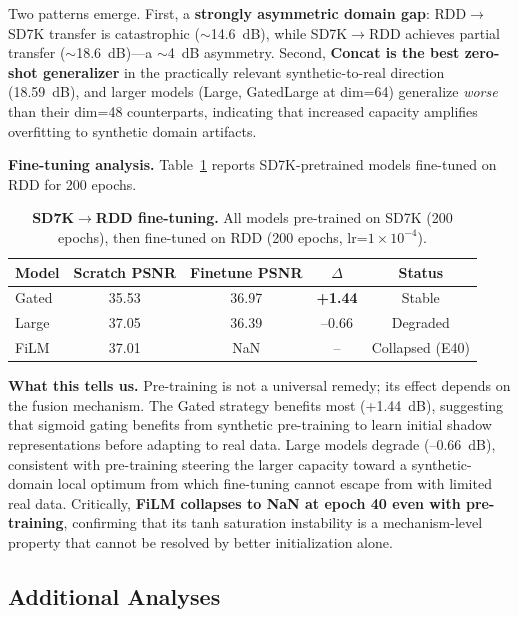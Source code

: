 \documentclass[pdflatex,sn-basic,Numbered]{sn-jnl}
\theoremstyle{thmstyleone}
\theoremstyle{thmstyletwo}
\theoremstyle{thmstylethree}
\begin{document}
Two patterns emerge. First, a \textbf{strongly asymmetric domain gap}: RDD$\rightarrow$SD7K transfer is catastrophic ($\sim$14.6~dB), while SD7K$\rightarrow$RDD achieves partial transfer ($\sim$18.6~dB)---a $\sim$4~dB asymmetry.
Second, \textbf{Concat is the best zero-shot generalizer} in the practically relevant synthetic-to-real direction (18.59~dB), and larger models (Large, GatedLarge at dim=64) generalize \textit{worse} than their dim=48 counterparts, indicating that increased capacity amplifies overfitting to synthetic domain artifacts.

\textbf{Fine-tuning analysis.}
Table~\ref{tab:finetune} reports SD7K-pretrained models fine-tuned on RDD for 200 epochs.

\begin{table}[t]
\caption{\textbf{SD7K$\rightarrow$RDD fine-tuning.} All models pre-trained on SD7K (200 epochs), then fine-tuned on RDD (200 epochs, lr=$1\times10^{-4}$).}
\label{tab:finetune}
\begin{tabular}{@{}lcccc@{}}
\toprule
\textbf{Model} & \textbf{Scratch PSNR} & \textbf{Finetune PSNR} & \textbf{$\Delta$} & \textbf{Status} \\
\midrule
Gated   & 35.53 & 36.97 & \textbf{+1.44} & Stable \\
Large   & 37.05 & 36.39 & --0.66 & Degraded \\
FiLM    & 37.01 & NaN   & --    & Collapsed (E40) \\
\bottomrule
\end{tabular}
\end{table}

\textbf{What this tells us.}
Pre-training is not a universal remedy; its effect depends on the fusion mechanism.
The Gated strategy benefits most (+1.44~dB), suggesting that sigmoid gating benefits from synthetic pre-training to learn initial shadow representations before adapting to real data.
Large models degrade (--0.66~dB), consistent with pre-training steering the larger capacity toward a synthetic-domain local optimum from which fine-tuning cannot escape from with limited real data.
Critically, \textbf{FiLM collapses to NaN at epoch 40 even with pre-training}, confirming that its tanh saturation instability is a mechanism-level property that cannot be resolved by better initialization alone.

\subsection{Additional Analyses}\label{sec:additional}
\end{document}
